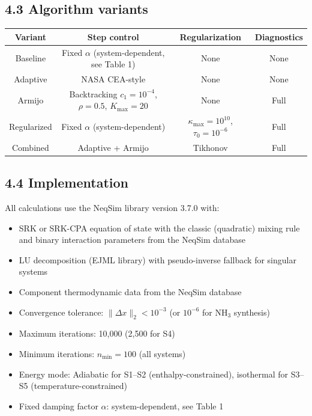 \documentclass[review,3p]{elsarticle}
\begin{document}
\subsection{4.3 Algorithm variants}

\begin{table}[htbp]
\centering
\begin{tabular}{cccc}
\toprule
Variant & Step control & Regularization & Diagnostics \\
\midrule
Baseline & Fixed $\alpha$ (system-dependent, see Table 1) & None & None \\
Adaptive & NASA CEA-style & None & None \\
Armijo & Backtracking $c_1 = 10^{-4}$, $\rho = 0.5$, $K_{\max} = 20$ & None & Full \\
Regularized & Fixed $\alpha$ (system-dependent) & $\kappa_{\max} = 10^{10}$, $\tau_0 = 10^{-6}$ & Full \\
Combined & Adaptive + Armijo & Tikhonov & Full \\
\bottomrule
\end{tabular}
\end{table}

\subsection{4.4 Implementation}

All calculations use the NeqSim library \citep{neqsim2024} version 3.7.0 with:
\begin{itemize}
  \item SRK or SRK-CPA equation of state with the classic (quadratic) mixing rule and binary interaction parameters from the NeqSim database
  \item LU decomposition (EJML library) with pseudo-inverse fallback for singular systems
  \item Component thermodynamic data from the NeqSim database
  \item Convergence tolerance: $\|\Delta x\|_2 < 10^{-3}$ (or $10^{-6}$ for NH$_3$ synthesis)
  \item Maximum iterations: 10,000 (2,500 for S4)
  \item Minimum iterations: $n_{\min} = 100$ (all systems)
  \item Energy mode: Adiabatic for S1–S2 (enthalpy-constrained), isothermal for S3–S5 (temperature-constrained)
  \item Fixed damping factor $\alpha$: system-dependent, see Table 1
\end{itemize}
\end{document}
